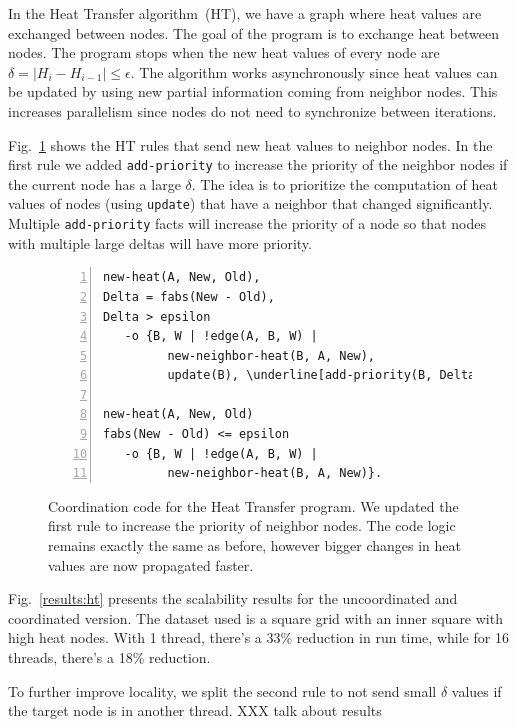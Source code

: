 In the Heat Transfer algorithm~(HT), we have a graph where heat values are
exchanged between nodes. The goal of the program is to exchange heat between
nodes. The program stops when the new heat values of every node are
$\delta = |H_i - H_{i-1}| \le \epsilon$. The algorithm works
asynchronously since heat values can be updated by using new partial information
coming from neighbor nodes. This increases parallelism since nodes do not need
to synchronize between iterations.

Fig.~\ref{code:ht} shows the HT rules that send new heat values to
neighbor nodes. In the first rule we added \texttt{add-priority} to increase the priority of the neighbor
nodes if the current node has a large $\delta$. The idea is to prioritize the
computation of heat values of nodes (using \texttt{update}) that have a neighbor
that changed significantly. Multiple \texttt{add-priority} facts will
increase the priority of a node so that nodes with multiple large deltas will
have more priority.

\begin{figure}[h!]
\scriptsize\begin{Verbatim}[numbers=left,commandchars=\\\[\]]
new-heat(A, New, Old),
Delta = fabs(New - Old),
Delta > epsilon
   -o {B, W | !edge(A, B, W) |
         new-neighbor-heat(B, A, New),
         update(B), \underline[add-priority(B, Delta)]}.

new-heat(A, New, Old)
fabs(New - Old) <= epsilon
   -o {B, W | !edge(A, B, W) |
         new-neighbor-heat(B, A, New)}.
\end{Verbatim}
  \caption{Coordination code for the Heat Transfer program. We updated the first rule
     to increase the priority of neighbor nodes.  The code logic remains exactly
     the same as before, however bigger changes in heat values are now
     propagated faster.}
  \label{code:ht}
\end{figure}
\normalsize

Fig.~\ref{results:ht} presents the scalability results for the uncoordinated
and coordinated version. The dataset used is a square grid with an inner square
with high heat nodes. With 1 thread, there's a 33\% reduction in run time, while
for 16 threads, there's a 18\% reduction.

To further improve locality, we split the second rule to
not send small $\delta$ values if the target node is in another
thread. XXX talk about results

